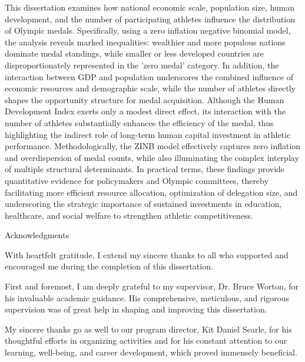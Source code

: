 \documentclass[11pt,twoside]{article}
\numberwithin{Theorem}{section}
\numberwithin{Definition}{section}
\numberwithin{Lemma}{section}
\numberwithin{Algorithm}{section}
\numberwithin{equation}{section}
\begin{document}
This dissertation examines how national economic scale, population size, human development, and the number of participating athletes influence the distribution of Olympic medals. Specifically, using a zero inflation negative binomial model, the analysis reveals marked inequalities: wealthier and more populous nations dominate medal standings, while smaller or less developed countries are disproportionately represented in the 'zero medal' category. In addition, the interaction between GDP and population underscores the combined influence of economic resources and demographic scale, while the number of athletes directly shapes the opportunity structure for medal acquisition. Although the Human Development Index exerts only a modest direct effect, its interaction with the number of athletes substantially enhances the efficiency of the medal, thus highlighting the indirect role of long-term human capital investment in athletic performance. Methodologically, the ZINB model effectively captures zero inflation and overdispersion of medal counts, while also illuminating the complex interplay of multiple structural determinants. In practical terms, these findings provide quantitative evidence for policymakers and Olympic committees, thereby facilitating more efficient resource allocation, optimization of delegation size, and underscoring the strategic importance of sustained investments in education, healthcare, and social welfare to strengthen athletic competitiveness. 

\clearpage

\begin{center}
\Large{Acknowledgments}
\end{center}

With heartfelt gratitude, I extend my sincere thanks to all who supported and encouraged me during the completion of this dissertation.

First and foremost, I am deeply grateful to my supervisor, Dr. Bruce Worton, for his invaluable academic guidance. His comprehensive, meticulous, and rigorous supervision was of great help in shaping and improving this dissertation.

My sincere thanks go as well to our program director, Kit Daniel Searle, for his thoughtful efforts in organizing activities and for his constant attention to our learning, well-being, and career development, which proved immensely beneficial.
\end{document}
